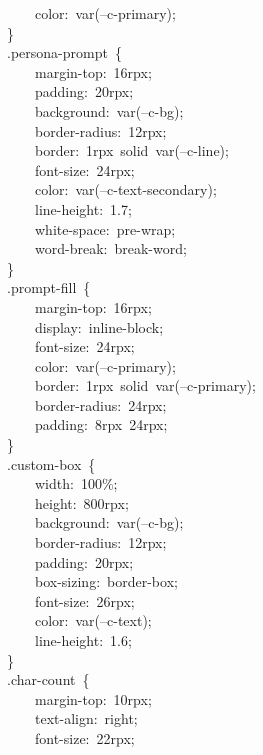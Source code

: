 \documentclass[a4paper,10pt]{article}
\begin{document}
{\ttfamily\footnotesize\raggedright
~~~~~~~~color:~var(--c-primary);\\
~~~~\}\\
~~~~.persona-prompt~\{\\
~~~~~~~~margin-top:~16rpx;\\
~~~~~~~~padding:~20rpx;\\
~~~~~~~~background:~var(--c-bg);\\
~~~~~~~~border-radius:~12rpx;\\
~~~~~~~~border:~1rpx~solid~var(--c-line);\\
~~~~~~~~font-size:~24rpx;\\
~~~~~~~~color:~var(--c-text-secondary);\\
~~~~~~~~line-height:~1.7;\\
~~~~~~~~white-space:~pre-wrap;\\
~~~~~~~~word-break:~break-word;\\
~~~~\}\\
~~~~.prompt-fill~\{\\
~~~~~~~~margin-top:~16rpx;\\
~~~~~~~~display:~inline-block;\\
~~~~~~~~font-size:~24rpx;\\
~~~~~~~~color:~var(--c-primary);\\
~~~~~~~~border:~1rpx~solid~var(--c-primary);\\
~~~~~~~~border-radius:~24rpx;\\
~~~~~~~~padding:~8rpx~24rpx;\\
~~~~\}\\
~~~~.custom-box~\{\\
~~~~~~~~width:~100\%;\\
~~~~~~~~height:~800rpx;\\
~~~~~~~~background:~var(--c-bg);\\
~~~~~~~~border-radius:~12rpx;\\
~~~~~~~~padding:~20rpx;\\
~~~~~~~~box-sizing:~border-box;\\
~~~~~~~~font-size:~26rpx;\\
~~~~~~~~color:~var(--c-text);\\
~~~~~~~~line-height:~1.6;\\
~~~~\}\\
~~~~.char-count~\{\\
~~~~~~~~margin-top:~10rpx;\\
~~~~~~~~text-align:~right;\\
~~~~~~~~font-size:~22rpx;\\
}
\end{document}
